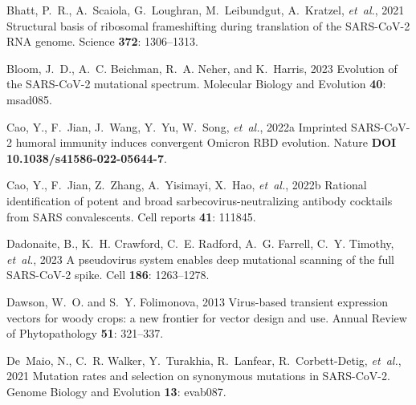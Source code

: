 \documentclass[9pt,twocolumn,twoside]{gsajnl_modified}
\begin{document}
{\begin{thebibliography}{76}
{Bhatt, P.~R., A.~Scaiola, G.~Loughran, M.~Leibundgut, A.~Kratzel, {\em
  et~al.\/}}, 2021 Structural basis of ribosomal frameshifting during
  translation of the {SARS-CoV-2 RNA} genome. Science {\bf 372}: 1306--1313.

{Bloom, J.~D., A.~C. Beichman, R.~A. Neher, {\rm and} K.~Harris}, 2023
  Evolution of the {SARS-CoV-2} mutational spectrum. Molecular Biology and
  Evolution {\bf 40}: msad085.

{Cao, Y., F.~Jian, J.~Wang, Y.~Yu, W.~Song, {\em et~al.\/}}, 2022{a} {Imprinted
  SARS-CoV-2 humoral immunity induces convergent Omicron RBD evolution}. Nature
  {\bf DOI 10.1038/s41586-022-05644-7}.

{Cao, Y., F.~Jian, Z.~Zhang, A.~Yisimayi, X.~Hao, {\em et~al.\/}}, 2022{b}
  Rational identification of potent and broad sarbecovirus-neutralizing
  antibody cocktails from {SARS} convalescents. Cell reports {\bf 41}: 111845.

{Dadonaite, B., K.~H. Crawford, C.~E. Radford, A.~G. Farrell, C.~Y. Timothy,
  {\em et~al.\/}}, 2023 {A pseudovirus system enables deep mutational scanning
  of the full SARS-CoV-2 spike}. Cell {\bf 186}: 1263--1278.

{Dawson, W.~O. {\rm and} S.~Y. Folimonova}, 2013 Virus-based transient
  expression vectors for woody crops: a new frontier for vector design and use.
  Annual Review of Phytopathology {\bf 51}: 321--337.

{De~Maio, N., C.~R. Walker, Y.~Turakhia, R.~Lanfear, R.~Corbett-Detig, {\em
  et~al.\/}}, 2021 Mutation rates and selection on synonymous mutations in
  {SARS-CoV-2}. Genome Biology and Evolution {\bf 13}: evab087.


\end{thebibliography}}
\end{document}
